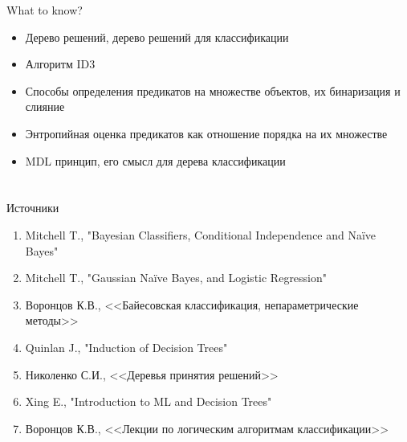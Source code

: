 \documentclass[compress,red,unicode]{beamer}
\begin{document}
\begin{frame}{What to know?}
\begin{itemize}
\item Дерево решений, дерево решений для классификации
\item Алгоритм ID3
\item Способы определения предикатов на множестве объектов, их бинаризация и слияние
\item Энтропийная оценка предикатов как отношение порядка на их множестве
\item MDL принцип, его смысл для дерева классификации

\end{itemize}
\end{frame}

\section{}

\begin{frame}{Источники}
\begin{enumerate}
	\item Mitchell T., "Bayesian Classifiers, Conditional Independence and Naïve Bayes"
	\item Mitchell T., "Gaussian Naïve Bayes, and Logistic Regression"
	\item Воронцов К.В., <<Байесовская классификация, непараметрические методы>>
	\item Quinlan J., "Induction of Decision Trees"
	\item Николенко С.И., <<Деревья принятия решений>>
	\item Xing E., "Introduction to ML and Decision Trees"
	\item Воронцов К.В., <<Лекции по логическим алгоритмам классификации>>

\end{enumerate}
\end{frame}
\end{document}
